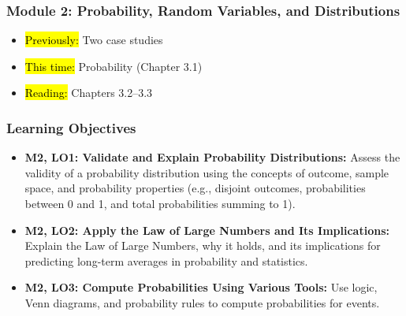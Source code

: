 
\begin{frame}
    \frametitle{Module 2: Probability, Random Variables, and Distributions}
    \begin{itemize}
        \item \hl{Previously: }Two case studies
        \item \hl{This time: }Probability (Chapter 3.1)
        \item \hl{Reading: }Chapters 3.2--3.3
    \end{itemize}

\end{frame}
\begin{frame}
    \frametitle{Learning Objectives}
    \begin{itemize}
        \item \textbf{M2, LO1: Validate and Explain Probability Distributions:} Assess the validity of a probability distribution using the concepts of outcome, sample space, and probability properties (e.g., disjoint outcomes, probabilities between 0 and 1, and total probabilities summing to 1).
        \item \textbf{M2, LO2: Apply the Law of Large Numbers and Its Implications:} Explain the Law of Large Numbers, why it holds, and its implications for predicting long-term averages in probability and statistics.
        \item \textbf{M2, LO3: Compute Probabilities Using Various Tools:} Use logic, Venn diagrams, and probability rules to compute probabilities for events.
    \end{itemize}
\end{frame}
